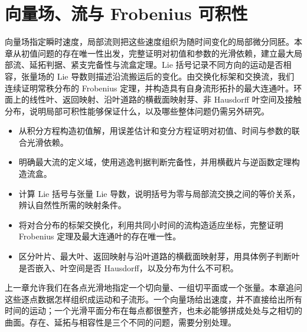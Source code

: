 
% 
% 

\chapter{向量场、流与 Frobenius 可积性}
\label{g1:ch:13}

\begin{chapterabstract}
	向量场指定瞬时速度，局部流则把这些速度组织为随时间变化的局部微分同胚。本章从初值问题的存在唯一性出发，完整证明对初值和参数的光滑依赖，建立最大局部流、延拓判据、紧支完备性与流盒定理。Lie 括号记录不同方向的运动是否相容，张量场的 Lie 导数则描述沿流搬运后的变化。由交换化标架和交换流，我们连续证明常秩分布的 Frobenius 定理，并构造具有自身流形拓扑的最大连通叶。环面上的线性叶、返回映射、沿叶道路的横截面映射芽、非 Hausdorff 叶空间及接触分布，说明局部可积性能够保证什么，以及哪些整体问题仍需另外研究。
\end{chapterabstract}

\begin{learninggoals}
	\begin{itemize}
		\item 从积分方程构造初值解，用误差估计和变分方程证明对初值、时间与参数的联合光滑依赖。
		\item 明确最大流的定义域，使用逃逸判据判断完备性，并用横截片与逆函数定理构造流盒。
		\item 计算 Lie 括号与张量 Lie 导数，说明括号为零与局部流交换之间的等价关系，辨认自然性所需的映射条件。
		\item 将对合分布的标架交换化，利用共同小时间的流构造适应坐标，完整证明 Frobenius 定理及最大连通叶的存在唯一性。
		\item 区分叶片、最大叶、返回映射与沿叶道路的横截面映射芽，用具体例子判断叶是否嵌入、叶空间是否 Hausdorff，以及分布为什么不可积。
	\end{itemize}
\end{learninggoals}

上一章允许我们在各点光滑地指定一个切向量、一组切平面或一个张量。本章追问这些逐点数据怎样组织成运动和子流形。一个向量场给出速度，并不直接给出所有时间的运动；一个光滑平面分布在每点都很整齐，也未必能够拼成处处与之相切的曲面。存在、延拓与相容性是三个不同的问题，需要分别处理。

